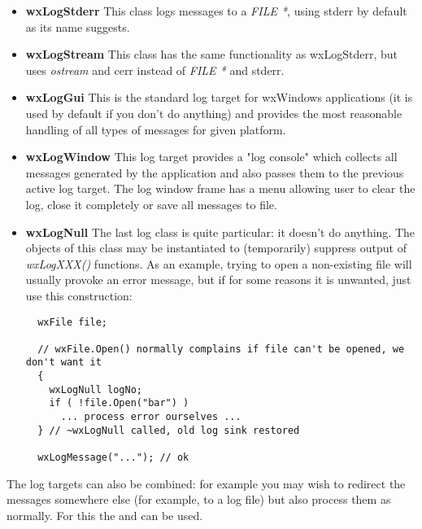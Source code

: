 \begin{itemize}\itemsep=0pt
\item{\bf wxLogStderr} This class logs messages to a {\it FILE *}, using
stderr by default as its name suggests.
\item{\bf wxLogStream} This class has the same functionality as wxLogStderr,
but uses {\it ostream} and cerr instead of {\it FILE *} and stderr.
\item{\bf wxLogGui} This is the standard log target for wxWindows
applications (it is used by default if you don't do anything) and provides the
most reasonable handling of all types of messages for given platform.
\item{\bf wxLogWindow} This log target provides a "log console" which
collects all messages generated by the application and also passes them to the
previous active log target. The log window frame has a menu allowing user to
clear the log, close it completely or save all messages to file.
\item{\bf wxLogNull} The last log class is quite particular: it doesn't do
anything. The objects of this class may be instantiated to (temporarily)
suppress output of {\it wxLogXXX()} functions. As an example, trying to open a
non-existing file will usually provoke an error message, but if for some
reasons it is unwanted, just use this construction:

{\small
\begin{verbatim}
  wxFile file;

  // wxFile.Open() normally complains if file can't be opened, we don't want it
  {
    wxLogNull logNo;
    if ( !file.Open("bar") )
      ... process error ourselves ...
  } // ~wxLogNull called, old log sink restored
  
  wxLogMessage("..."); // ok
\end{verbatim}
}
\end{itemize}

The log targets can also be combined: for example you may wish to redirect the
messages somewhere else (for example, to a log file) but also process them as
normally. For this the  and 
 can be used.

